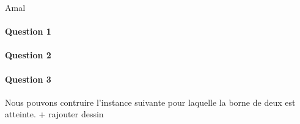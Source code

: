 Amal
\paragraph{Question 1}

\paragraph{Question 2}

\paragraph{Question 3}

Nous pouvons contruire l'instance suivante pour laquelle la borne de
deux est atteinte. + rajouter dessin